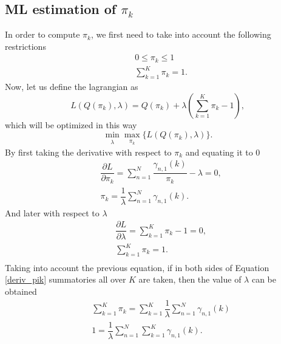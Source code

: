 \documentclass[12pt]{article}
\begin{document}
\subsection{ML estimation of $\pi_{k}$}
In order to compute $\pi_{k}$, we first need to take into account the following restrictions
\begin{align}
& 0 \leq \pi_{k} \leq 1 \\
& \sum\limits_{k = 1}^{K} \pi_{k} = 1.
\end{align}
Now, let us define the lagrangian as
\begin{equation}
\label{lagrange_pik}
L\left( Q(\pi_{k}),\lambda \right) = Q(\pi_{k}) + \lambda \left( \sum \limits_{k=1}^{K} \pi_{k} - 1 \right),
\end{equation}
which will be optimized in this way
\begin{equation}
\label{minmax_lagrange_pik}
\min_{\substack{\lambda}} \max_{\substack{\pi_{k}}} \lbrace L\left( Q(\pi_{k}),\lambda \right) \rbrace.
\end{equation}
By first taking the derivative with respect to $\pi_{k}$ and equating it to 0
\begin{equation}
\label{deriv_pik}
\begin{split}
& \dfrac{\partial L}{\partial \pi_{k}} = \sum \limits_{n=1}^{N} \dfrac{\gamma_{n,1}(k)}{\pi_{k}} - \lambda = 0, \\
& \pi_{k} = \dfrac{1}{\lambda} \sum \limits_{n=1}^{N} \gamma_{n,1}(k).
\end{split}
\end{equation}
And later with respect to $\lambda$
\begin{equation}
\begin{split}
& \dfrac{\partial L}{\partial \lambda} = \sum \limits_{k=1}^{K} \pi_{k} - 1 = 0,\\
& \sum \limits_{k=1}^{K} \pi_{k} = 1.\\
\end{split}
\end{equation}
Taking into account the previous equation, if in both sides of Equation \ref{deriv_pik} summatories all over $K$ are taken, then the value of $\lambda$ can be obtained
\begin{equation}
\begin{split}
& \sum \limits_{k=1}^{K}\pi_{k} = \sum \limits_{k=1}^{K} \dfrac{1}{\lambda} \sum \limits_{n=1}^{N} \gamma_{n,1}(k)\\
& 1 = \dfrac{1}{\lambda} \sum \limits_{n=1}^{N}\sum \limits_{k=1}^{K}\gamma_{n,1}(k).\\
\end{split}
\end{equation}
\end{document}
